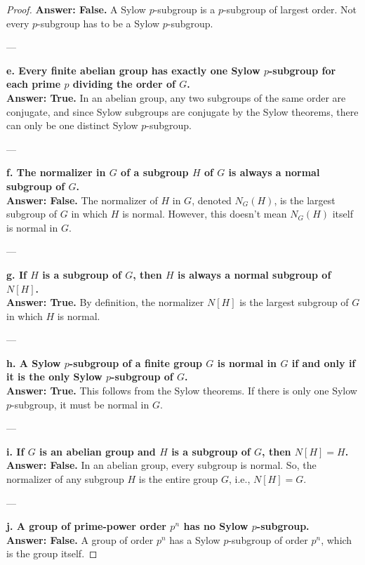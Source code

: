 \documentclass[12pt]{amsart}
\theoremstyle{definition}
\numberwithin{equation}{section}
\theoremstyle{plain}
\begin{document}
\begin{exercise}{10}
\begin{proof}
\textbf{Answer: False.} A Sylow \( p \)-subgroup is a \( p \)-subgroup of largest order. Not every \( p \)-subgroup has to be a Sylow \( p \)-subgroup.

---

\textbf{e. Every finite abelian group has exactly one Sylow \( p \)-subgroup for each prime \( p \) dividing the order of \( G \).}\\

\textbf{Answer: True.} In an abelian group, any two subgroups of the same order are conjugate, and since Sylow subgroups are conjugate by the Sylow theorems, there can only be one distinct Sylow \( p \)-subgroup.

---

\textbf{f. The normalizer in \( G \) of a subgroup \( H \) of \( G \) is always a normal subgroup of \( G \).}\\

\textbf{Answer: False.} The normalizer of \( H \) in \( G \), denoted \( N_G(H) \), is the largest subgroup of \( G \) in which \( H \) is normal. However, this doesn't mean \( N_G(H) \) itself is normal in \( G \).

---

\textbf{g. If \( H \) is a subgroup of \( G \), then \( H \) is always a normal subgroup of \( N[H] \).}\\

\textbf{Answer: True.} By definition, the normalizer \( N[H] \) is the largest subgroup of \( G \) in which \( H \) is normal.

---

\textbf{h. A Sylow \( p \)-subgroup of a finite group \( G \) is normal in \( G \) if and only if it is the only Sylow \( p \)-subgroup of \( G \).}\\

\textbf{Answer: True.} This follows from the Sylow theorems. If there is only one Sylow \( p \)-subgroup, it must be normal in \( G \).

---

\textbf{i. If \( G \) is an abelian group and \( H \) is a subgroup of \( G \), then \( N[H] = H \).}\\

\textbf{Answer: False.} In an abelian group, every subgroup is normal. So, the normalizer of any subgroup \( H \) is the entire group \( G \), i.e., \( N[H] = G \).

---

\textbf{j. A group of prime-power order \( p^n \) has no Sylow \( p \)-subgroup.}\\

\textbf{Answer: False.} A group of order \( p^n \) has a Sylow \( p \)-subgroup of order \( p^n \), which is the group itself.

    \end{proof}
\end{exercise}
\end{document}
